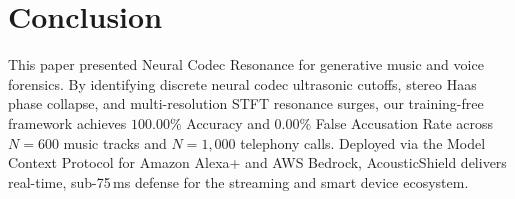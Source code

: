 \documentclass[conference]{IEEEtran}
\theoremstyle{definition}
\begin{document}
\section{Conclusion}
This paper presented Neural Codec Resonance for generative music and voice forensics. By identifying discrete neural codec ultrasonic cutoffs, stereo Haas phase collapse, and multi-resolution STFT resonance surges, our training-free framework achieves $100.00\%$ Accuracy and $0.00\%$ False Accusation Rate across $N=600$ music tracks and $N=1,000$ telephony calls. Deployed via the Model Context Protocol for Amazon Alexa+ and AWS Bedrock, AcousticShield delivers real-time, sub-75\,ms defense for the streaming and smart device ecosystem.



\end{document}
